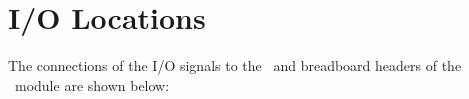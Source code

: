 \documentclass[letterpaper,11pt,oneside]{memoir}
\begin{document}


\appendix

\chapter{I/O Locations}

The connections of the I/O signals to the \digpmod\ and breadboard headers of 
the \product\ module are shown below:

\end{document}
